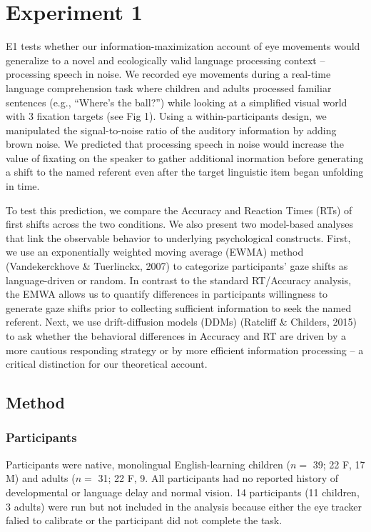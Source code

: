 \documentclass[10pt, letterpaper]{article}
\begin{document}
\section{Experiment 1}\label{experiment-1}

E1 tests whether our information-maximization account of eye movements
would generalize to a novel and ecologically valid language processing
context -- processing speech in noise. We recorded eye movements during
a real-time language comprehension task where children and adults
processed familiar sentences (e.g., ``Where's the ball?'') while looking
at a simplified visual world with 3 fixation targets (see Fig 1). Using
a within-participants design, we manipulated the signal-to-noise ratio
of the auditory information by adding brown noise. We predicted that
processing speech in noise would increase the value of fixating on the
speaker to gather additional inormation before generating a shift to the
named referent even after the target linguistic item began unfolding in
time.

To test this prediction, we compare the Accuracy and Reaction Times
(RTs) of first shifts across the two conditions. We also present two
model-based analyses that link the observable behavior to underlying
psychological constructs. First, we use an exponentially weighted moving
average (EWMA) method (Vandekerckhove \& Tuerlinckx, 2007) to categorize
participants' gaze shifts as language-driven or random. In contrast to
the standard RT/Accuracy analysis, the EMWA allows us to quantify
differences in participants willingness to generate gaze shifts prior to
collecting sufficient information to seek the named referent. Next, we
use drift-diffusion models (DDMs) (Ratcliff \& Childers, 2015) to ask
whether the behavioral differences in Accuracy and RT are driven by a
more cautious responding strategy or by more efficient information
processing -- a critical distinction for our theoretical account.

\subsection{Method}\label{method}

\subsubsection{Participants}\label{participants}

Participants were native, monolingual English-learning children (\(n=\)
39; 22 F, 17 M) and adults (\(n=\) 31; 22 F, 9. All participants had no
reported history of developmental or language delay and normal vision.
14 participants (11 children, 3 adults) were run but not included in the
analysis because either the eye tracker falied to calibrate or the
participant did not complete the task.
\end{document}
